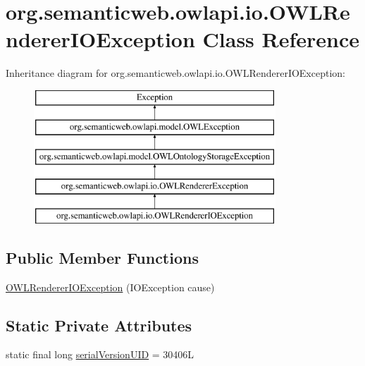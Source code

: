 \hypertarget{classorg_1_1semanticweb_1_1owlapi_1_1io_1_1_o_w_l_renderer_i_o_exception}{\section{org.\-semanticweb.\-owlapi.\-io.\-O\-W\-L\-Renderer\-I\-O\-Exception Class Reference}
\label{classorg_1_1semanticweb_1_1owlapi_1_1io_1_1_o_w_l_renderer_i_o_exception}
}
Inheritance diagram for org.\-semanticweb.\-owlapi.\-io.\-O\-W\-L\-Renderer\-I\-O\-Exception\-:\begin{figure}[H]
\begin{center}
\leavevmode
\includegraphics[height=5.000000cm]{classorg_1_1semanticweb_1_1owlapi_1_1io_1_1_o_w_l_renderer_i_o_exception}
\end{center}
\end{figure}
\subsection*{Public Member Functions}
\begin{DoxyCompactItemize}
\item 
\hyperlink{classorg_1_1semanticweb_1_1owlapi_1_1io_1_1_o_w_l_renderer_i_o_exception_ae1d1a63c84e3c2453a319cc528f565f9}{O\-W\-L\-Renderer\-I\-O\-Exception} (I\-O\-Exception cause)
\end{DoxyCompactItemize}
\subsection*{Static Private Attributes}
\begin{DoxyCompactItemize}
\item 
static final long \hyperlink{classorg_1_1semanticweb_1_1owlapi_1_1io_1_1_o_w_l_renderer_i_o_exception_adca5d446aa849f174cac6f21f1a8d225}{serial\-Version\-U\-I\-D} = 30406\-L
\end{DoxyCompactItemize}
